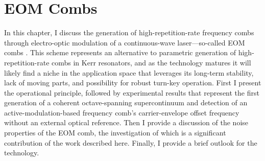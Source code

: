  \chapter{EOM Combs}

In this chapter, I discuss the generation of high-repetition-rate frequency combs through electro-optic modulation of a continuous-wave laser---so-called EOM combs \cite{Kobayashi1972,Kourogi1993,Murata2000,Sakamoto2007,Morohashi2008,Ishizawa2010,Wu2010,Supradeepa2012,Metcalf2013,Wu2013}. This scheme represents an alternative to parametric generation of high-repetition-rate combs in Kerr resonators, and as the technology matures it will likely find a niche in the application space that leverages its long-term stability, lack of moving parts, and possibility for robust turn-key operation. First I present the operational principle, followed by experimental results that represent the first generation of a coherent octave-spanning supercontinuum and detection of an active-modulation-based frequency comb's carrier-envelope offset frequency without an external optical reference. Then I provide a discussion of the noise properties of the EOM comb, the investigation of which is a significant contribution of the work described here. Finally, I provide a brief outlook for the technology.

